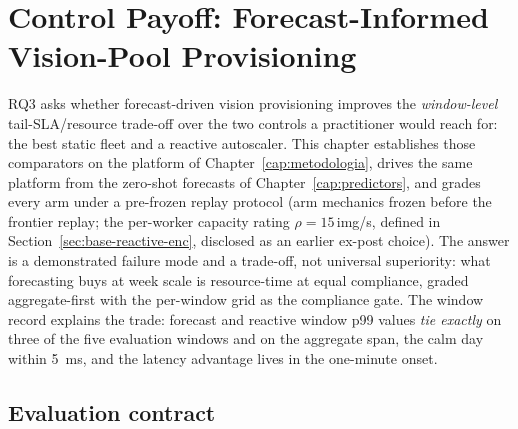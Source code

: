 \chapter{Control Payoff: Forecast-Informed Vision-Pool Provisioning}
\label{cap:closedloop}
\label{cap:baselines}%

RQ3 asks whether forecast-driven vision provisioning improves the
\emph{window-level} tail-SLA/resource trade-off over the two controls a
practitioner would reach for: the best static fleet and a reactive autoscaler.
This chapter establishes those comparators on the platform of
Chapter~\ref{cap:metodologia}, drives the same platform from the zero-shot
forecasts of Chapter~\ref{cap:predictors}, and grades every arm under a pre-frozen
replay protocol (arm mechanics frozen before the frontier replay; the
per-worker capacity rating $\rho{=}15$\,\si{img/s}, defined in
Section~\ref{sec:base-reactive-enc}, disclosed as an earlier ex-post
choice). The answer is a
demonstrated failure mode and a trade-off, not universal superiority: what
forecasting buys at week scale is resource-time at equal compliance,
graded aggregate-first with the per-window grid as the compliance gate.
The window record explains the trade: forecast and reactive window p99
values \emph{tie exactly} on three of the five evaluation windows and on
the aggregate span, the calm day within \SI{5}{\milli\second}, and the
latency advantage lives in the one-minute onset.

\section{Evaluation contract}
\label{sec:cl-contract}

